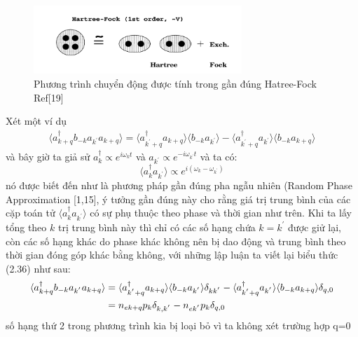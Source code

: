   \begin{figure}[hc]
  \centering
  \includegraphics[width=0.70\textwidth]{./Figures/hatree-fock1.png}
  \caption[Hatree-Fock]{Phương trình chuyển động được tính trong gần đúng Hatree-Fock Ref[19]}
  \label{fig:Hatree-Fock}
  \end{figure}
 Xét một ví dụ 
  \begin{align}
  \langle a_{k+q}^{\dagger}b_{-k}a_{k^{'}}a_{k+q}\rangle = \langle a_{k^{'}+q}^{\dagger}a_{k+q}\rangle\langle b_{-k}a_{k^{'}}\rangle - \langle a_{k^{'}+q}^{\dagger}a_{k^{'}}\rangle\langle b_{-k}a_{k+q}\rangle
  \end{align}
  và bây giờ ta giả sử $a_{k}^{\dagger}\propto e^{i\omega_k t}$ và $a_{k^{'}}\propto e^{-i\omega_{k^{'}} t}$ và ta có:
  \begin{equation}
  \langle a_{k}^{\dagger}a_{k^{'}}\rangle \propto e^{i(\omega_k -\omega_{k^{'}})}
  \end{equation}
  nó được biết đến như là phương pháp gần đúng pha ngẫu nhiên (Random Phase Approximation [1,15], ý tưởng gần đúng này cho rằng giá trị trung bình của các cặp toán tử $\langle a_{k}^{\dagger}a_{k^{'}}\rangle$ có sự phụ thuộc theo phase và thời gian như trên. Khi ta lấy tổng theo $k$ trị trung bình này thì chỉ có các số hạng chứa $k = k^{'}$ được giử lại, còn các số hạng khác do phase khác không nên bị dao động và trung bình theo thời gian đóng góp khác bằng không, với những lập luận ta viết lại biểu thức (2.36) như sau:
  \begin{align}
  \langle a_{k+q}^{\dagger}b_{-k}a_{k^{'}}a_{k+q}\rangle &= \langle a_{k^{'}+q}^{\dagger}a_{k+q}\rangle\langle b_{-k}a_{k^{'}}\rangle\delta_{kk^{'}} - \langle a_{k^{'}+q}^{\dagger}a_{k^{'}}\rangle\langle b_{-k}a_{k+q}\rangle\delta_{q,0}\notag \\
  &=n_{ek+q}p_k\delta_{k,k^{'}} - n_{ek^{'}}p_{k}\delta_{q,0}
  \end{align} 
  số hạng thứ 2 trong phương trình kia bị loại bỏ vì ta không xét trường hợp q=0
